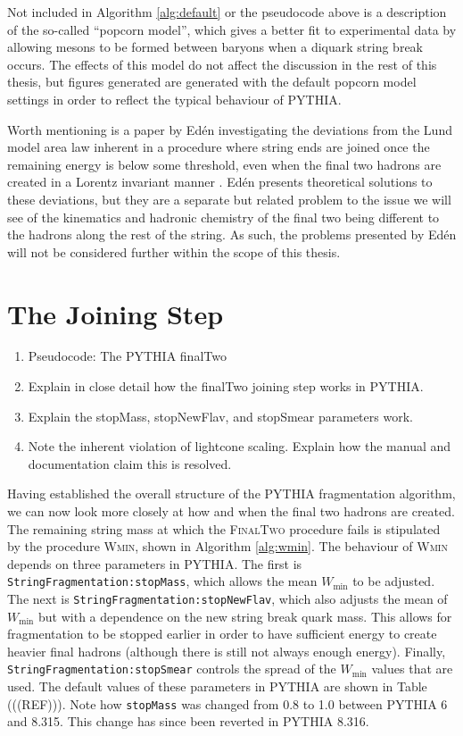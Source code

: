 \documentclass[12pt,a4paper]{report}
\begin{document}
Not included in Algorithm \ref{alg:default} or the pseudocode above is a description of the so-called ``popcorn model'', which gives a better fit to experimental data by allowing mesons to be formed between baryons when a diquark string break occurs. The effects of this model do not affect the discussion in the rest of this thesis, but figures generated are generated with the default popcorn model settings in order to reflect the typical behaviour of PYTHIA.

Worth mentioning is a paper by Ed\'en investigating the deviations from the Lund model area law inherent in a procedure where string ends are joined once the remaining energy is below some threshold, even when the final two hadrons are created in a Lorentz invariant manner \cite{Eden:2000in}. Ed\'en presents theoretical solutions to these deviations, but they are a separate but related problem to the issue we will see of the kinematics and hadronic chemistry of the final two being different to the hadrons along the rest of the string. As such, the problems presented by Ed\'en will not be considered further within the scope of this thesis.

\section{The Joining Step}
\begin{enumerate}
\item Pseudocode: The PYTHIA finalTwo
\item Explain in close detail how the finalTwo joining step works in PYTHIA.
\item Explain the stopMass, stopNewFlav, and stopSmear parameters work.
\item Note the inherent violation of lightcone scaling. Explain how the manual and documentation claim this is resolved.
\end{enumerate}

Having established the overall structure of the PYTHIA fragmentation algorithm, we can now look more closely at how and when the final two hadrons are created. The remaining string mass at which the \textsc{FinalTwo} procedure fails is stipulated by the procedure \textsc{Wmin}, shown in Algorithm \ref{alg:wmin}. The behaviour of \textsc{Wmin} depends on three parameters in PYTHIA. The first is \texttt{StringFragmentation:stopMass}, which allows the mean $W_\text{min}$ to be adjusted. The next is \texttt{StringFragmentation:stopNewFlav}, which also adjusts the mean of $W_\text{min}$ but with a dependence on the new string break quark mass. This allows for fragmentation to be stopped earlier in order to have sufficient energy to create heavier final hadrons (although there is still not always enough energy). Finally, \texttt{StringFragmentation:stopSmear} controls the spread of the $W_\text{min}$ values that are used. The default values of these parameters in PYTHIA are shown in Table (((REF))). Note how \texttt{stopMass} was changed from 0.8 to 1.0 between PYTHIA 6 and 8.315. This change has since been reverted in PYTHIA 8.316.
\end{document}
